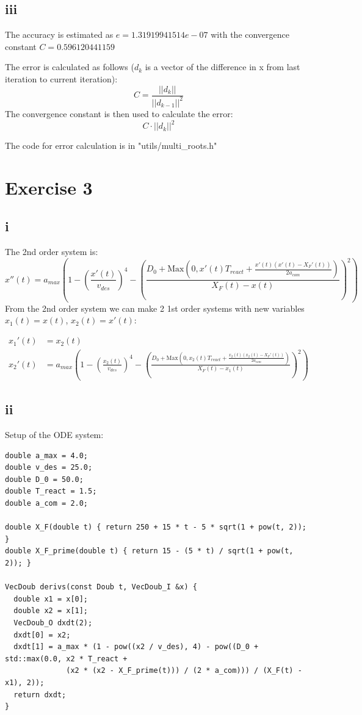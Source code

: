 \documentclass{article}
\begin{document}
\subsection*{iii}
The accuracy is estimated as $e=1.31919941514e-07$ with the convergence constant $C=0.596120441159$

The error is calculated as follows ($d_k$ is a vector of the difference in x from last iteration to current iteration):
$$
C=\frac{||d_k||}{||d_{k-1}||^2}
$$
The convergence constant is then used to calculate the error:
$$C\cdot||d_k||^2$$

The code for error calculation is in "utils/multi\_roots.h"

\newpage
\section*{Exercise 3}

\subsection*{i}
The 2nd order system is:
$$
x''(t)=a_{max}\left(
  1-\left(\frac{x'(t)}{v_{des}}\right)^4
  -\left( \frac{D_0+\text{Max}\left(0,x'(t)T_{react}+\frac{x'(t)(x'(t)-X_F'(t))}{2a_{com}}\right)}{X_F(t)-x(t)} \right)^2
\right)
$$
From the 2nd order system we can make 2 1st order systems with new variables
$x_1(t)=x(t)$, $x_2(t)=x'(t)$:

$$
\begin{aligned}
  x_1'(t) &= x_2(t) \\
  x_2'(t) &=a_{max}\left(
    1-\left(\frac{x_2(t)}{v_{des}}\right)^4
    -\left( \frac{D_0+\text{Max}\left(0,x_2(t)T_{react}+\frac{x_2(t)(x_2(t)-X_F'(t))}{2a_{com}}\right)}{X_F(t)-x_1(t)} \right)^2\right)
\end{aligned}
$$

\subsection*{ii}
Setup of the ODE system:
\begin{verbatim}
double a_max = 4.0;
double v_des = 25.0;
double D_0 = 50.0;
double T_react = 1.5;
double a_com = 2.0;

double X_F(double t) { return 250 + 15 * t - 5 * sqrt(1 + pow(t, 2)); }
double X_F_prime(double t) { return 15 - (5 * t) / sqrt(1 + pow(t, 2)); }

VecDoub derivs(const Doub t, VecDoub_I &x) {
  double x1 = x[0];
  double x2 = x[1];
  VecDoub_O dxdt(2);
  dxdt[0] = x2;
  dxdt[1] = a_max * (1 - pow((x2 / v_des), 4) - pow((D_0 + std::max(0.0, x2 * T_react +
              (x2 * (x2 - X_F_prime(t))) / (2 * a_com))) / (X_F(t) - x1), 2));
  return dxdt;
}
\end{verbatim}
\end{document}
